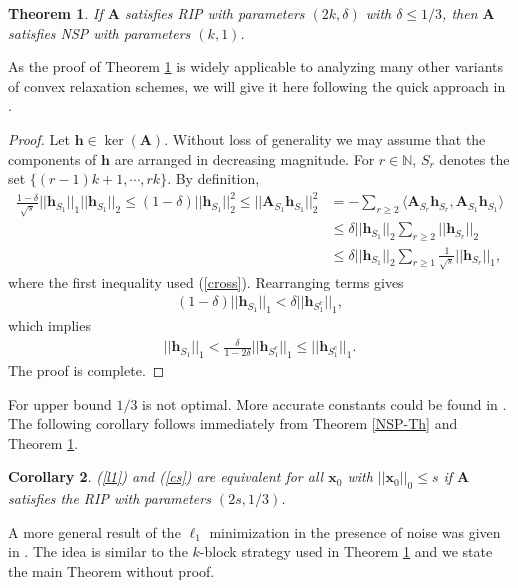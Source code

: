 \documentclass[11pt]{article}
\numberwithin{equation}{section}
\theoremstyle{plain}
\newtheorem{Th}{Theorem}[section]
\newtheorem{Cor}[Th]{Corollary}
\theoremstyle{definition}
\def\N{{\mathbb N}}
\def\A{{\mathbf A}}
\def\x{{\mathbf x}}
\def\h{{\mathbf{h}}}
\begin{document}
\begin{Th}\label{RIP-NSP}
If $\A$ satisfies RIP with parameters $(2k, \delta)$ with $\delta\leq 1/3$, then $\A$ satisfies NSP with parameters $(k, 1)$. 
\end{Th}
As the proof of Theorem \ref{RIP-NSP} is widely applicable to analyzing many other variants of convex relaxation schemes, we will give it here following the quick approach in \cite{rauhut2010compressive}.  
\begin{proof}
Let $\h\in\ker(\A)$. Without loss of generality we may assume that the components of $\h$ are arranged in decreasing magnitude. For $r\in\N$, $S_r$ denotes the set $\{(r-1)k+1, \cdots, rk\}$. By definition, 
\begin{align*}
\frac{1-\delta}{\sqrt{s}}||\h_{S_1}||_1||\h_{S_1}||_2\leq (1-\delta)||\h_{S_1}||_2^2\leq||\A_{S_1}\h_{S_1}||_2^2&=-\sum_{r\geq 2}\langle \A_{S_r}\h_{S_r}, \A_{S_1}\h_{S_1}\rangle\\
&\leq \delta ||\h_{S_1}||_2\sum_{r\geq 2}||\h_{S_r}||_2\\
&\leq \delta ||\h_{S_1}||_2\sum_{r\geq 1}\frac{1}{\sqrt{s}}||\h_{S_r}||_1,
\end{align*}
where the first inequality used (\ref{cross}). Rearranging terms gives
\begin{align*}
(1-\delta)||\h_{S_1}||_1<\delta||\h_{S_1^c}||_1, 
\end{align*}
which implies
\begin{align*}
||\h_{S_1}||_1<\frac{\delta}{1-2\delta}||\h_{S_1^c}||_1\leq ||\h_{S_1^c}||_1. 
\end{align*}
The proof is complete.    
\end{proof}
For upper bound $1/3$ is not optimal. More accurate constants could be found in \cite{foucart2013invitation}. The following corollary follows immediately from Theorem \ref{NSP-Th} and Theorem \ref{RIP-NSP}. 

\begin{Cor}
(\ref{l1}) and (\ref{cs}) are equivalent for all $\x_0$ with $||\x_0||_0\leq s$ if $\A$ satisfies the RIP with parameters $(2s, 1/3)$.  
\end{Cor}

A more general result of the $\ell_1$ minimization in the presence of noise was given in \cite{candes2006stable}. The idea is similar to the $k$-block strategy used in Theorem \ref{RIP-NSP} and we state the main Theorem without  proof. 
\end{document}
